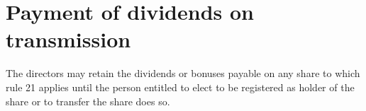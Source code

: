 \section{Payment of dividends on transmission}

The directors may retain the dividends or bonuses payable on any share to which rule 21 applies until the person entitled to elect to be registered as holder of the share or to transfer the share does so. 